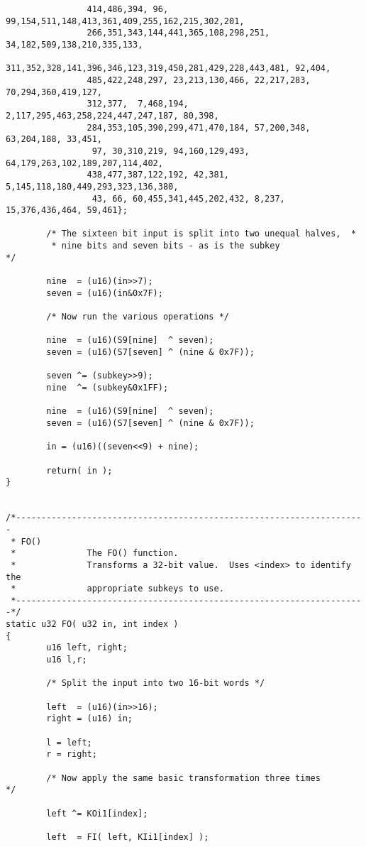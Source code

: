 \begin{verbatim}
                414,486,394, 96, 99,154,511,148,413,361,409,255,162,215,302,201,
                266,351,343,144,441,365,108,298,251, 34,182,509,138,210,335,133,
                311,352,328,141,396,346,123,319,450,281,429,228,443,481, 92,404,
                485,422,248,297, 23,213,130,466, 22,217,283, 70,294,360,419,127,
                312,377,  7,468,194,  2,117,295,463,258,224,447,247,187, 80,398,
                284,353,105,390,299,471,470,184, 57,200,348, 63,204,188, 33,451,
                 97, 30,310,219, 94,160,129,493, 64,179,263,102,189,207,114,402,
                438,477,387,122,192, 42,381,  5,145,118,180,449,293,323,136,380,
                 43, 66, 60,455,341,445,202,432, 8,237, 15,376,436,464, 59,461};

        /* The sixteen bit input is split into two unequal halves,  *
         * nine bits and seven bits - as is the subkey                    */

        nine  = (u16)(in>>7);
        seven = (u16)(in&0x7F);

        /* Now run the various operations */

        nine  = (u16)(S9[nine]  ^ seven);
        seven = (u16)(S7[seven] ^ (nine & 0x7F));

        seven ^= (subkey>>9);
        nine  ^= (subkey&0x1FF);

        nine  = (u16)(S9[nine]  ^ seven);
        seven = (u16)(S7[seven] ^ (nine & 0x7F));

        in = (u16)((seven<<9) + nine);

        return( in );
}


/*---------------------------------------------------------------------
 * FO()
 *              The FO() function.
 *              Transforms a 32-bit value.  Uses <index> to identify the
 *              appropriate subkeys to use.
 *---------------------------------------------------------------------*/
static u32 FO( u32 in, int index )
{
        u16 left, right;
        u16 l,r;

        /* Split the input into two 16-bit words */

        left  = (u16)(in>>16);
        right = (u16) in;

        l = left;
        r = right;

        /* Now apply the same basic transformation three times         */

        left ^= KOi1[index];

        left  = FI( left, KIi1[index] );


\end{verbatim}
